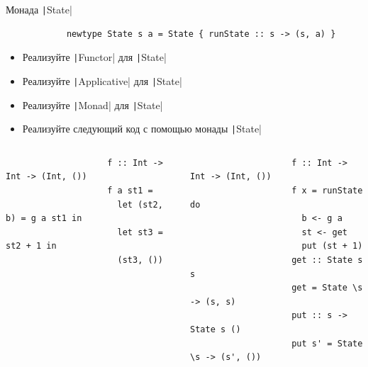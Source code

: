     \begin{frame}[fragile]{Монада \texttt|State|}
        \begin{verbatim}
            newtype State s a = State { runState :: s -> (s, a) }
        \end{verbatim}
        \begin{itemize}
            \item[\todo] Реализуйте \texttt|Functor| для \texttt|State|
            \item[\todo] Реализуйте \texttt|Applicative| для \texttt|State|
            \item[\todo] Реализуйте \texttt|Monad| для \texttt|State|
            \item[\todo] Реализуйте следующий код с помощью монады \texttt|State|
        \end{itemize}
        \vspace{-1em}
        \begin{columns}[onlytextwidth]
            \begin{column}[t]{0.485\textwidth}
                \begin{verbatim}
                    f :: Int -> Int -> (Int, ())
                    f a st1 =
                      let (st2, b) = g a st1 in
                      let st3 = st2 + 1 in
                      (st3, ())
                \end{verbatim}
            \end{column}\hfill%
            \begin{column}[t]{0.485\textwidth}
                \pause
                \begin{verbatim}
                    f :: Int -> Int -> (Int, ())
                    f x = runState do
                      b <- g a
                      st <- get
                      put (st + 1)
                    get :: State s s
                    get = State \s -> (s, s)
                    put :: s -> State s ()
                    put s' = State \s -> (s', ())
                \end{verbatim}
            \end{column}
        \end{columns}
    \end{frame}



